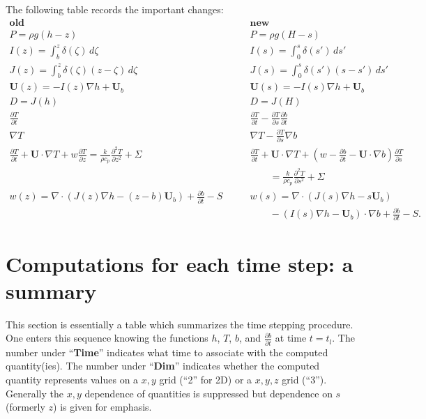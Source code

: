 \documentclass[12pt,final]{amsart}%
\theoremstyle{plain}
\theoremstyle{definition}
\theoremstyle{remark}
\newcommand{\ddt}[1]{\ensuremath{\frac{\partial #1}{\partial t}}}
\newcommand{\ddz}[1]{\ensuremath{\frac{\partial #1}{\partial z}}}
\newcommand{\dds}[1]{\ensuremath{\frac{\partial #1}{\partial s}}}
\newcommand{\dddsds}[1]{\ensuremath{\frac{\partial^2 #1}{\partial s^2}}}
\newcommand{\dddzdz}[1]{\ensuremath{\frac{\partial^2 #1}{\partial z^2}}}
\newcommand{\diverg}{\nabla\cdot}
\newcommand{\grad}{\nabla}
\newcommand{\bU}{{\mathbf{U}}}
\begin{document}
The following table records the important changes:
$$\begin{array}{ll}
\textbf{old} & \textbf{new} \\
P=\rho g(h-z) \phantom{dlksaflkdjflajsddlksaflkdjflaj} & P=\rho g(H-s) \phantom{dlksaflkdjflajsddlksaflkdjflaj} \\
I(z)=\int_b^z\delta(\zeta)\,d\zeta & I(s) = \int_0^{s} \delta(s')\,ds' \\
J(z)=\int_b^z\delta(\zeta)(z-\zeta)\,d\zeta & J(s) = \int_0^{s} \delta(s')(s-s')\,ds' \\
\bU(z)=-I(z)\grad h + \bU_b & \bU(s)=-I(s)\grad h+ \bU_b \\
D=J(h) & D=J(H) \\
\ddt{T} & \ddt{T}-\dds{T}\ddt{b} \\
\grad T & \grad T- \dds{T}\grad b \\
\ddt{T}+\bU\cdot\grad T + w\ddz{T}=\frac{k}{\rho c_p} \dddzdz{T} + \Sigma & \ddt{T}+\bU\cdot\grad T + \left(w-\ddt{b}-\bU\cdot\grad b\right)\dds{T} \\
 & \qquad =\frac{k}{\rho c_p} \dddsds{T} + \Sigma \\
w(z)=\diverg \left(J(z)\grad h-(z-b)\bU_b\right)+\ddt{b}-S\qquad & w(s)=\diverg \left(J(s)\grad h-s\bU_b\right) \\
 & \qquad-\left(I(s)\grad h-\bU_b\right)\cdot\grad b + \ddt{b}-S.
\end{array}$$


\newpage
\section{Computations for each time step: a summary}

This section is essentially a table which summarizes the time stepping procedure.  One enters this sequence knowing the functions $h$, $T$, $b$, and $\ddt{b}$ at time $t=t_l$.  The number under ``\textbf{Time}'' indicates what time to associate with the computed quantity(ies).  The number under ``\textbf{Dim}'' indicates whether the computed quantity represents values on a $x,y$ grid (``2'' for 2D) or a $x,y,z$ grid (``3'').  Generally the $x,y$ dependence of quantities is suppressed but dependence on $s$ (formerly $z$) is given for emphasis.
\end{document}
